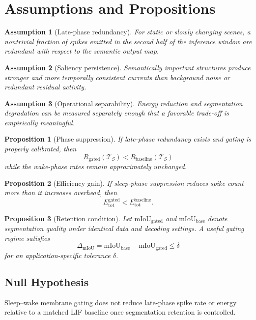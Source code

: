 \documentclass[11pt]{article}
\newtheorem{assumption}{Assumption}
\newtheorem{proposition}{Proposition}
\begin{document}
\section{Assumptions and Propositions}
\begin{assumption}[Late-phase redundancy]
For static or slowly changing scenes, a nontrivial fraction of spikes emitted in the second half of the inference window are redundant with respect to the semantic output map.
\end{assumption}

\begin{assumption}[Saliency persistence]
Semantically important structures produce stronger and more temporally consistent currents than background noise or redundant residual activity.
\end{assumption}

\begin{assumption}[Operational separability]
Energy reduction and segmentation degradation can be measured separately enough that a favorable trade-off is empirically meaningful.
\end{assumption}

\begin{proposition}[Phase suppression]
If late-phase redundancy exists and gating is properly calibrated, then
\[
R_{\text{gated}}(\mathcal{T}_S)<R_{\text{baseline}}(\mathcal{T}_S)
\]
while the wake-phase rates remain approximately unchanged.
\end{proposition}

\begin{proposition}[Efficiency gain]
If sleep-phase suppression reduces spike count more than it increases overhead, then
\[
E_{\mathrm{tot}}^{\mathrm{gated}}<E_{\mathrm{tot}}^{\mathrm{baseline}}.
\]
\end{proposition}

\begin{proposition}[Retention condition]
Let $\mathrm{mIoU}_{\mathrm{gated}}$ and $\mathrm{mIoU}_{\mathrm{base}}$ denote segmentation quality under identical data and decoding settings. A useful gating regime satisfies
\[
\Delta_{\mathrm{mIoU}}=\mathrm{mIoU}_{\mathrm{base}}-\mathrm{mIoU}_{\mathrm{gated}}\le \delta
\]
for an application-specific tolerance $\delta$.
\end{proposition}

\subsection*{Null Hypothesis}
Sleep--wake membrane gating does not reduce late-phase spike rate or energy relative to a matched LIF baseline once segmentation retention is controlled.
\end{document}
